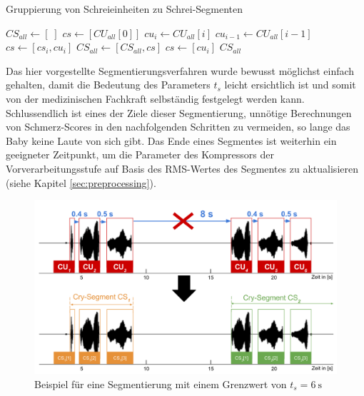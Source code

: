 \begin{algorithm}[h]
	\caption{Gruppierung von Schreieinheiten zu Schrei-Segmenten}
	\label{alg:crySegment}
	\begin{algorithmic}[1]
		\State $ CS_{all} \gets [\;]$
		\State $ cs \gets [CU_{all}[0]]$
						\State $ cu_i \gets CU_{all}[i]$
						\State $cu_{i-1} \gets CU_{all}[i-1]$
								\State $cs \gets [cs_i , cu_i]$
						\Else
								\State $CS_{all} \gets [CS_{all}, cs]$
								\State $cs \gets [cu_i]$
						\EndIf
				\EndFor
		\Return $CS_{all}$
		
		\EndFunction
		
	\end{algorithmic}
\end{algorithm}


Das hier vorgestellte Segmentierungsverfahren wurde bewusst möglichst einfach gehalten, damit die Bedeutung des Parameters $t_{s}$ leicht ersichtlich ist und somit von der medizinischen Fachkraft selbständig festgelegt werden kann. Schlussendlich ist eines der Ziele dieser Segmentierung, unnötige Berechnungen von Schmerz-Scores in den nachfolgenden Schritten zu vermeiden, so lange das Baby keine Laute von sich gibt. Das Ende eines Segmentes ist weiterhin ein geeigneter Zeitpunkt, um die Parameter des Kompressors der Vorverarbeitungsstufe auf Basis des RMS-Wertes des Segmentes zu aktualisieren (siehe Kapitel \ref{sec:preprocessing}).

\begin{figure}[H]
	\centering
	\includegraphics[width=1\textwidth]{bilder/segmentierung06.png}
	\caption[Beispiel für eine Segmentierung]{Beispiel für eine Segmentierung mit einem Grenzwert von $t_s = \SI{6}{\second}$}
	\label{img:segmenting06}
\end{figure}

